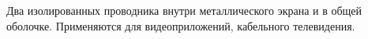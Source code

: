 Два изолированных проводника внутри металлического экрана и в 
общей оболочке. Применяются для видеоприложений, кабельного телевидения.